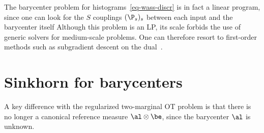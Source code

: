 The barycenter problem for histograms~\eqref{eq-wass-discr} is in fact a linear program, since one can look for the $S$ couplings $(\P_s)_s$ between each input and the barycenter itself
	Although this problem is an LP, its scale forbids the use of generic solvers for medium-scale problems. One can therefore resort to first-order methods such as subgradient descent on the dual~\cite{Carlier-NumericsBarycenters}.

\section{Sinkhorn for barycenters}

	A key difference with the regularized two-marginal OT problem is that there is no longer a canonical reference measure $\al \otimes \be$, since the barycenter $\al$ is unknown.


